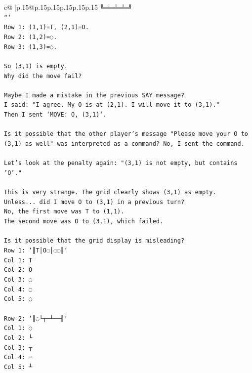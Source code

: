 \documentclass{article}
\begin{document}
{\begin{supertabular}{c@{$\;$}|p{.15\linewidth}@{}p{.15\linewidth}p{.15\linewidth}p{.15\linewidth}p{.15\linewidth}p{.15\linewidth}}
{{{\texttt{╚═╧═╧═╧═╝} \\
\texttt{```} \\
\texttt{Row 1: (1,1)=T, (2,1)=O.} \\
\texttt{Row 2: (1,2)=◌.} \\
\texttt{Row 3: (1,3)=◌.} \\
\\ 
\texttt{So (3,1) is empty.} \\
\texttt{Why did the move fail?} \\
\\ 
\texttt{Maybe I made a mistake in the previous SAY message?} \\
\texttt{I said: "I agree. My O is at (2,1). I will move it to (3,1)."} \\
\texttt{Then I sent `MOVE: O, (3,1)`.} \\
\\ 
\texttt{Is it possible that the other player's message "Please move your O to (3,1) as well" was interpreted as a command? No, I sent the command.} \\
\\ 
\texttt{Let's look at the penalty again: "(3,1) is not empty, but contains 'O'."} \\
\\ 
\texttt{This is very strange. The grid clearly shows (3,1) as empty.} \\
\texttt{Unless... did I move O to (3,1) in a previous turn?} \\
\texttt{No, the first move was T to (1,1).} \\
\texttt{The second move was O to (3,1), which failed.} \\
\\ 
\texttt{Is it possible that the grid display is misleading?} \\
\texttt{Row 1: `║T│O◌│◌◌║`} \\
\texttt{Col 1: T} \\
\texttt{Col 2: O} \\
\texttt{Col 3: ◌} \\
\texttt{Col 4: ◌} \\
\texttt{Col 5: ◌} \\
\\ 
\texttt{Row 2: `║◌└┬─┴──╢`} \\
\texttt{Col 1: ◌} \\
\texttt{Col 2: └} \\
\texttt{Col 3: ┬} \\
\texttt{Col 4: ─} \\
\texttt{Col 5: ┴} \\
}}}
\end{supertabular}}
\end{document}

